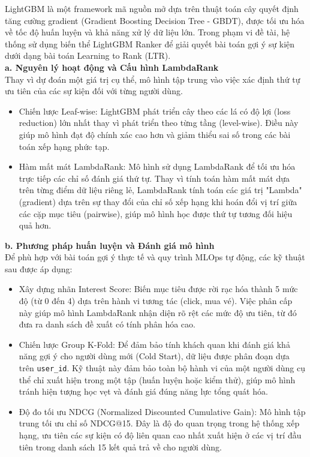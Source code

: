 \indent \indent LightGBM là một framework mã nguồn mở dựa trên thuật toán cây quyết định tăng cường gradient (Gradient Boosting Decision Tree - GBDT), được tối ưu hóa về tốc độ huấn luyện và khả năng xử lý dữ liệu lớn. 
Trong phạm vi đề tài, hệ thống sử dụng biến thể LightGBM Ranker để giải quyết bài toán gợi ý sự kiện dưới dạng bài toán Learning to Rank (LTR).\\
\indent \textbf{a. Nguyên lý hoạt động và Cấu hình LambdaRank}\\
\indent Thay vì dự đoán một giá trị cụ thể, mô hình tập trung vào việc xác định thứ tự ưu tiên của các sự kiện đối với từng người dùng.
\begin{itemize}
    \item[1.] Chiến lược Leaf-wise: LightGBM phát triển cây theo các lá có độ lợi (loss reduction) lớn nhất thay vì phát triển theo từng tầng (level-wise). Điều này giúp mô hình đạt độ chính xác cao hơn và giảm thiểu sai số trong các bài toán xếp hạng phức tạp.
    \item[2.] Hàm mất mát LambdaRank: Mô hình sử dụng LambdaRank để tối ưu hóa trực tiếp các chỉ số đánh giá thứ tự. Thay vì tính toán hàm mất mát dựa trên từng điểm dữ liệu riêng lẻ, LambdaRank tính toán các giá trị "Lambda" (gradient) dựa trên sự thay đổi của chỉ số xếp hạng khi hoán đổi vị trí giữa các cặp mục tiêu (pairwise), giúp mô hình học được thứ tự tương đối hiệu quả hơn.

\end{itemize}

\indent \textbf{b. Phương pháp huấn luyện và Đánh giá mô hình}\\
\indent Để phù hợp với bài toán gợi ý thực tế và quy trình MLOps tự động, các kỹ thuật sau được áp dụng:

\begin{itemize}
    \item[1.] Xây dựng nhãn Interest Score: Biến mục tiêu được rời rạc hóa thành 5 mức độ (từ 0 đến 4) dựa trên hành vi tương tác (click, mua vé). Việc phân cấp này giúp mô hình LambdaRank nhận diện rõ rệt các mức độ ưu tiên, từ đó đưa ra danh sách đề xuất có tính phân hóa cao.
    \item[2.] Chiến lược Group K-Fold: Để đảm bảo tính khách quan khi đánh giá khả năng gợi ý cho người dùng mới (Cold Start), dữ liệu được phân đoạn dựa trên \texttt{user\_id}. Kỹ thuật này đảm bảo toàn bộ hành vi của một người dùng cụ thể chỉ xuất hiện trong một tập (huấn luyện hoặc kiểm thử), giúp mô hình tránh hiện tượng học vẹt và đánh giá đúng năng lực tổng quát hóa.
    \item[3.] Độ đo tối ưu NDCG (Normalized Discounted Cumulative Gain): Mô hình tập trung tối ưu chỉ số NDCG@15. Đây là độ đo quan trọng trong hệ thống xếp hạng, ưu tiên các sự kiện có độ liên quan cao nhất xuất hiện ở các vị trí đầu tiên trong danh sách 15 kết quả trả về cho người dùng.
\end{itemize}

